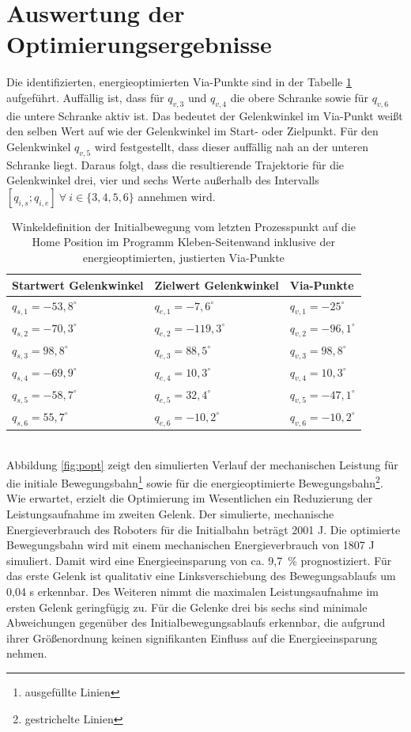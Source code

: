 \section{Auswertung der Optimierungsergebnisse}
Die identifizierten, energieoptimierten Via-Punkte sind in der Tabelle \ref{tab:optviapunkte} aufgeführt. Auffällig ist, dass für $q_{v,3}$ und $q_{v,4}$ die obere Schranke sowie für $q_{v,6}$ die untere Schranke  aktiv ist. Das bedeutet der Gelenkwinkel im Via-Punkt weißt den selben Wert auf wie der Gelenkwinkel im Start- oder Zielpunkt. Für den Gelenkwinkel $q_{v,5}$ wird festgestellt, dass dieser auffällig nah an der unteren Schranke liegt. Daraus folgt, dass die resultierende Trajektorie für die Gelenkwinkel drei, vier und sechs Werte außerhalb des Intervalls $[q_{i,s};q_{i,e}] ~\forall~ i \in \{3,4,5,6\}$ annehmen wird. 
\\
\begin{table}[tbph]
	\centering
	\caption{Winkeldefinition der Initialbewegung vom letzten Prozesspunkt auf die  Home Position im Programm Kleben-Seitenwand inklusive der energieoptimierten, justierten Via-Punkte}
	\label{tab:optviapunkte}
	\begin{tabular}{|l|l|l|}
		\hline
		Startwert Gelenkwinkel&  Zielwert Gelenkwinkel&  Via-Punkte\\
		\hline
		$q_{s,1} = -53,8^{\circ}$			&  $q_{e,1} = -7,6^{\circ}$  		&$q_{v,1} = -25^{\circ}$  \\
		\hline
		$q_{s,2} = -70,3^{\circ}$	&  $q_{e,2} = -119,3^{\circ}$    	&$q_{v,2} = -96,1^{\circ}$  \\
		\hline
		$q_{s,3} = 98,8^{\circ}$	&  $q_{e,3} = 88,5^{\circ}$ 		&$q_{v,3} = 98,8^{\circ}$  \\
		\hline
		$q_{s,4} = -69,9^{\circ}$	&  $q_{e,4} = 10,3^{\circ}$ 		&$q_{v,4} = 10,3^{\circ}$  \\
		\hline
		$q_{s,5} = -58,7^{\circ}$	&  $q_{e,5} = 32,4^{\circ}$  		&$q_{v,5} = -47,1^{\circ}$  \\
		\hline
		$q_{s,6} = 55,7^{\circ}$	&  $q_{e,6} = -10,2^{\circ}$ 		&$q_{v,6} = -10,2^{\circ}$  \\
		\hline
	\end{tabular}
\end{table}
\\
Abbildung \ref{fig:popt} zeigt den simulierten Verlauf der mechanischen Leistung für die initiale Bewegungsbahn\footnote{ausgefüllte Linien} sowie für die energieoptimierte Bewegungsbahn\footnote{gestrichelte Linien}. Wie erwartet, erzielt die Optimierung im Wesentlichen ein Reduzierung der Leistungsaufnahme im zweiten Gelenk. Der simulierte, mechanische Energieverbrauch des Roboters für die Initialbahn beträgt 2001 J. Die optimierte Bewegungsbahn wird mit einem mechanischen Energieverbrauch von 1807 J simuliert. Damit wird eine Energieeinsparung von ca. 9,7~\% prognostiziert. Für das erste Gelenk ist qualitativ eine Linksverschiebung des Bewegungsablaufs um 0,04 s erkennbar. Des Weiteren nimmt die maximalen Leistungsaufnahme im ersten Gelenk geringfügig zu. Für die Gelenke drei bis sechs sind minimale Abweichungen gegenüber des Initialbewegungsablaufs erkennbar, die aufgrund ihrer Größenordnung keinen signifikanten Einfluss auf die Energieeinsparung nehmen. 

